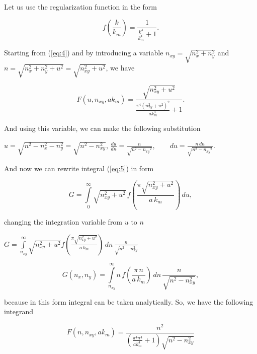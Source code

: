 \documentclass[twoside, 10pt]{article}
\begin{document}
\begin{multicols}{2}
    Let us use the regularization function in the form

\setcounter{equation}{0}
\renewcommand{\theequation}{A.\arabic{equation}}

\begin{equation}
f\left(\frac{k}{k_m}\right) = \frac{1}{\frac{k^{4}}{k_{m}^{4}} + 1}.
\end{equation}


    Starting from (\ref{eq:4}) and by introducing a variable \(n_{xy} = \sqrt{n_x^2 + n_y^2}\) and \(n = \sqrt{n_x^2 + n_y^2 + u^2} = \sqrt{n_{xy}^2 + u^2}\), we have 

\noindent
\begin{equation}
F\left(u, n_{xy}, ak_m\right) = \frac{\sqrt{n_{\mathit{xy}}^{2} + u^{2}}}{\frac{\pi^{4} {\left(n_{\mathit{xy}}^{2} + u^{2}\right)}^{2}}{\mathit{ak}_{m}^{4}} + 1}.
\end{equation}


And using this variable, we can make the following substitution

\vspace{1.5mm}
\(u = \sqrt{n^2 - n_x^2 - n_y^2} = \sqrt{n^2 - n_{xy}^2}\),
\(\frac{du}{dn} = \frac{n}{\sqrt{n^{2} - \mathit{n_{xy}}^{2}}}\), $\,\,\,\,\,\,\,\,\,$
 \(d{u}= \frac{n\,d{n}}{\sqrt{n^{2} - \mathit{n_{xy}}^{2}}}\).

    And now we can rewrite integral (\ref{eq:5}) in form

\begin{equation}
G%
 = \int\limits_{0}^{\infty}\sqrt{n_{xy}^2+u^2}\,
f\left(\frac{\pi\sqrt{n_{xy}^2+u^2}}{a\,k_m}\right)\,d{u},
\end{equation}

changing the integration variable from \(u\) to \(n\)

\noindent
$G%
 = \int\limits_{n_{xy}}^{\infty}\sqrt{n_{xy}^2+u^2}
 f\left(\frac{\pi\sqrt{n_{xy}^2+u^2}}{a\,k_m}\right)\,dn\,{\frac{n}{\sqrt{n^{2} - n_{xy}^{2}}}}$

\begin{equation}
G\left(n_x, n_y\right) = \int\limits_{n_{xy}}^{\infty}n\,
f\left(\frac{\pi\,n}{a\,k_m}\right)\,dn\,{\frac{n}{\sqrt{n^{2} - n_{xy}^{2}}}},
\end{equation}

    because in this form integral can be taken analytically. So, we have
the following integrand

\begin{equation} \label{eq:A5}
F\left(n, n_{xy}, ak_m\right) = \frac{n^{2}}{{\left(\frac{\pi^{4} n^{4}}{\mathit{ak}_{m}^{4}} + 1\right)} \sqrt{n^{2} - n_{\mathit{xy}}^{2}}}
\end{equation}


\end{multicols}
\end{document}
